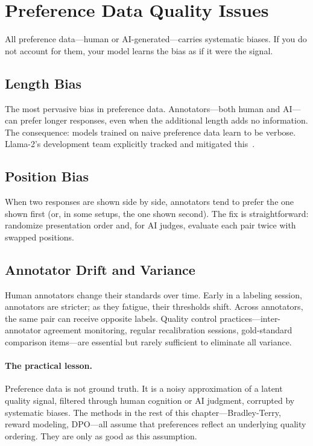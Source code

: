\section{Preference Data Quality Issues}
\label{sec:preference-quality}

All preference data---human or AI-generated---carries systematic biases. If you do not account for them, your model learns the bias as if it were the signal.

\subsection{Length Bias}

The most pervasive bias in preference data. Annotators---both human and AI---can prefer longer responses, even when the additional length adds no information. The consequence: models trained on naive preference data learn to be verbose. Llama-2's development team explicitly tracked and mitigated this~\cite{touvron2023llama2}.

\subsection{Position Bias}

When two responses are shown side by side, annotators tend to prefer the one shown first (or, in some setups, the one shown second). The fix is straightforward: randomize presentation order and, for AI judges, evaluate each pair twice with swapped positions.

\subsection{Annotator Drift and Variance}

Human annotators change their standards over time. Early in a labeling session, annotators are stricter; as they fatigue, their thresholds shift. Across annotators, the same pair can receive opposite labels. Quality control practices---inter-annotator agreement monitoring, regular recalibration sessions, gold-standard comparison items---are essential but rarely sufficient to eliminate all variance.

\paragraph{The practical lesson.} Preference data is not ground truth. It is a noisy approximation of a latent quality signal, filtered through human cognition or AI judgment, corrupted by systematic biases. The methods in the rest of this chapter---Bradley-Terry, reward modeling, DPO---all assume that preferences reflect an underlying quality ordering. They are only as good as this assumption.

